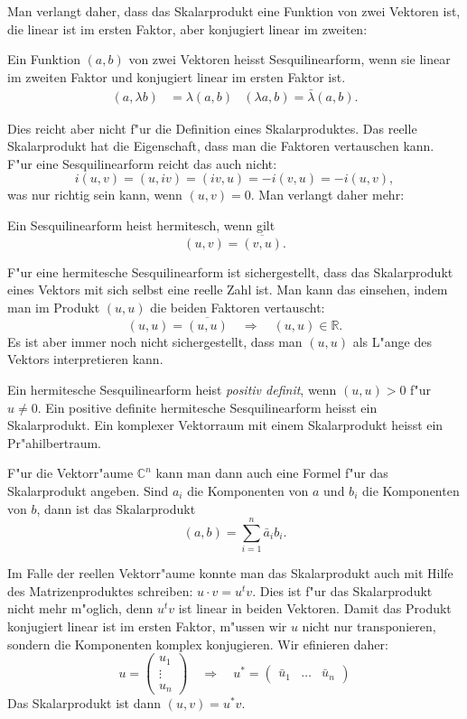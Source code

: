 Man verlangt daher, dass das Skalarprodukt eine Funktion von zwei Vektoren
ist, die linear ist im ersten Faktor, aber konjugiert linear im zweiten:
\begin{definition}
Ein Funktion $(a,b)$ von zwei Vektoren heisst Sesquilinearform, wenn
sie linear im zweiten Faktor und konjugiert linear im ersten Faktor ist.
\begin{align*}
(a,\lambda b)&=\lambda (a,b)&(\lambda a,b)=\bar\lambda (a,b).
\end{align*}
\end{definition}
Dies reicht aber nicht f"ur die Definition eines Skalarproduktes.
Das reelle Skalarprodukt hat die Eigenschaft, dass man die Faktoren
vertauschen kann. F"ur eine Sesquilinearform reicht das auch nicht:
\[
i(u,v)=(u,iv)=(iv,u)=-i(v,u)=-i(u,v),
\]
was nur richtig sein kann, wenn $(u,v)=0$. Man verlangt daher mehr:

\begin{definition}
Ein Sesquilinearform heist hermitesch, wenn gilt
\[
(u,v)=\overline{(v,u)}.
\]
\end{definition}
F"ur eine hermitesche Sesquilinearform ist sichergestellt, dass
das Skalarprodukt eines Vektors mit sich selbst eine reelle Zahl
ist. Man kann das einsehen, indem man im Produkt $(u,u)$ die beiden
Faktoren vertauscht:
\[
(u,u)=\overline{(u,u)}\quad\Rightarrow\quad (u,u)\in\mathbb R.
\]
Es ist aber immer noch nicht sichergestellt, dass man $(u,u)$ als
L"ange des Vektors interpretieren kann. 

\begin{definition}
Ein hermitesche Sesquilinearform heist {\em positiv definit}, wenn
$(u,u)>0$ f"ur $u\ne 0$. Ein positive definite hermitesche Sesquilinearform
heisst ein Skalarprodukt. Ein komplexer Vektorraum mit einem Skalarprodukt
heisst ein Pr"ahilbertraum.
\end{definition}


F"ur die Vektorr"aume $\mathbb C^n$ kann man dann auch eine Formel
f"ur das Skalarprodukt angeben. Sind $a_i$ die Komponenten von $a$ und
$b_i$ die Komponenten von $b$, dann ist das Skalarprodukt
\[
(a,b)=\sum_{i=1}^n \bar a_ib_i.
\]

Im Falle der reellen Vektorr"aume konnte man das Skalarprodukt
auch mit Hilfe des Matrizenproduktes schreiben: $u\cdot v=u^tv$.
Dies ist f"ur das Skalarprodukt nicht mehr m"oglich, denn $u^tv$
ist linear in beiden Vektoren.
Damit das Produkt konjugiert linear ist im ersten Faktor, m"ussen
wir $u$ nicht nur transponieren, sondern die Komponenten komplex konjugieren.
Wir efinieren daher:
\[
u=\begin{pmatrix}u_1\\\vdots\\u_n\end{pmatrix}
\quad\Rightarrow\quad
u^*=\begin{pmatrix}\bar u_1&\dots&\bar u_n\end{pmatrix}
\]
Das Skalarprodukt ist dann $(u,v)=u^*v$.

